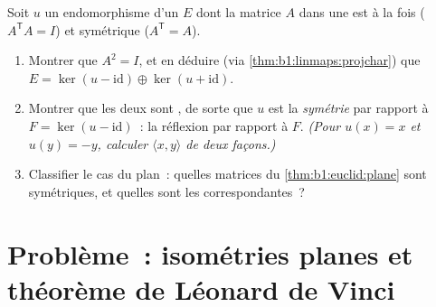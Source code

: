 \begin{exercise}[$\star\star\star$]\label{exo:b1:euclid:12}
Soit $u$ un endomorphisme d'un  $E$ dont la matrice
$A$ dans une   est à la fois 
($A^{\mathsf T}A = I$) et symétrique ($A^{\mathsf T} = A$).
\begin{enumerate}
  \item Montrer que $A^2 = I$, et en déduire (via
        \cref{thm:b1:linmaps:projchar}) que $E = \ker(u -
        \mathrm{id}) \oplus \ker(u + \mathrm{id})$.
  \item Montrer que les deux  sont , de
        sorte que $u$ est la \emph{symétrie } par
        rapport à $F = \ker(u - \mathrm{id})$~: la réflexion par
        rapport à $F$.
        \emph{(Pour $u(x) = x$ et $u(y) = -y$, calculer $\langle
        x, y\rangle$ de deux façons.)}
  \item Classifier le cas du plan~: quelles matrices du
        \cref{thm:b1:euclid:plane} sont symétriques, et quelles
        sont les  correspondantes~?
\end{enumerate}
\end{exercise}

\section{Problème~: isométries planes et théorème de Léonard de Vinci}

